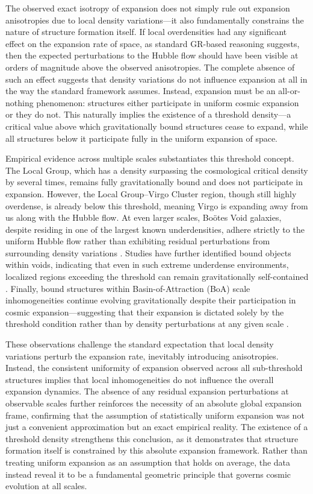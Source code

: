 \documentclass[aps,prd,reprint,superscriptaddress]{revtex4-2}
\begin{document}
The observed exact isotropy of expansion does not simply rule out expansion anisotropies due to local density variations---it also fundamentally constrains the nature of structure formation itself. If local overdensities had any significant effect on the expansion rate of space, as standard GR-based reasoning suggests, then the expected perturbations to the Hubble flow should have been visible at orders of magnitude above the observed anisotropies. The complete absence of such an effect suggests that density variations do not influence expansion at all in the way the standard framework assumes. Instead, expansion must be an all-or-nothing phenomenon: structures either participate in uniform cosmic expansion or they do not. This naturally implies the existence of a threshold density---a critical value above which gravitationally bound structures cease to expand, while all structures below it participate fully in the uniform expansion of space.

Empirical evidence across multiple scales substantiates this threshold concept. The Local Group, which has a density surpassing the cosmological critical density by several times, remains fully gravitationally bound and does not participate in expansion. However, the Local Group–Virgo Cluster region, though still highly overdense, is already below this threshold, meaning Virgo is expanding away from us along with the Hubble flow. At even larger scales, Bo\"{o}tes Void galaxies, despite residing in one of the largest known underdensities, adhere strictly to the uniform Hubble flow rather than exhibiting residual perturbations from surrounding density variations \cite{Kirshner1981, Szomoru1996}. Studies have further identified bound objects within voids, indicating that even in such extreme underdense environments, localized regions exceeding the threshold can remain gravitationally self-contained \cite{Rieder2013, Alpaslan2014}. Finally, bound structures within Basin-of-Attraction (BoA) scale inhomogeneities continue evolving gravitationally despite their participation in cosmic expansion---suggesting that their expansion is dictated solely by the threshold condition rather than by density perturbations at any given scale \cite{Tully2014, Valade2024}.

These observations challenge the standard expectation that local density variations perturb the expansion rate, inevitably introducing anisotropies. Instead, the consistent uniformity of expansion observed across all sub-threshold structures implies that local inhomogeneities do not influence the overall expansion dynamics. The absence of any residual expansion perturbations at observable scales further reinforces the necessity of an absolute global expansion frame, confirming that the assumption of statistically uniform expansion was not just a convenient approximation but an exact empirical reality. The existence of a threshold density strengthens this conclusion, as it demonstrates that structure formation itself is constrained by this absolute expansion framework. Rather than treating uniform expansion as an assumption that holds on average, the data instead reveal it to be a fundamental geometric principle that governs cosmic evolution at all scales.
\end{document}
